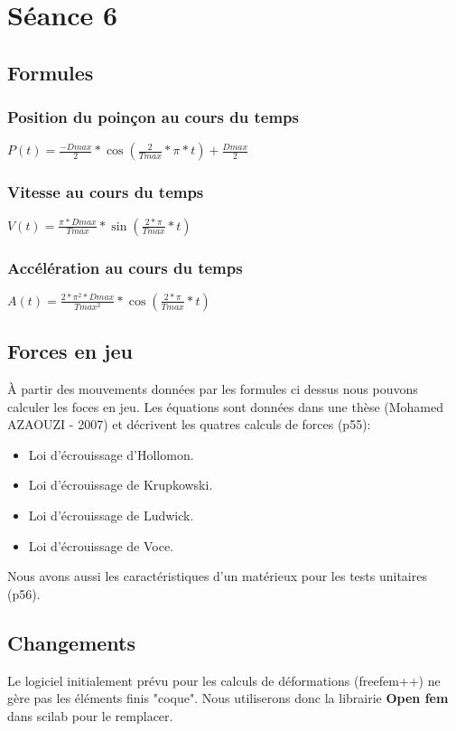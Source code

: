 \section{Séance 6}

\subsection{Formules}
\subsubsection{Position du poinçon au cours du temps}
$P(t) = \frac{-Dmax}{2}*\cos(\frac{2}{Tmax}*\pi*t)+\frac{Dmax}{2}$

\subsubsection{Vitesse au cours du temps}
$V(t) = \frac{\pi*Dmax}{Tmax}*\sin(\frac{2*\pi}{Tmax}*t)$

\subsubsection{Accélération au cours du temps}
$A(t) = \frac{2*\pi^2*Dmax}{Tmax^2}*\cos(\frac{2*\pi}{Tmax}*t)$

\subsection{Forces en jeu}
À partir des mouvements données par les formules ci dessus nous pouvons calculer les foces en jeu.
Les équations sont données dans une thèse (Mohamed AZAOUZI - 2007) et décrivent les quatres calculs de forces (p55):
\begin{itemize}
    \item Loi d'écrouissage d'Hollomon.
    \item Loi d'écrouissage de Krupkowski.
    \item Loi d'écrouissage de Ludwick.
    \item Loi d'écrouissage de Voce.
\end{itemize}
Nous avons aussi les caractéristiques d'un matérieux pour les tests unitaires (p56).

\subsection{Changements}
Le logiciel initialement prévu pour les calculs de déformations (freefem++) ne gère pas les éléments finis "coque".
Nous utiliserons donc la librairie \textbf{Open fem} dans scilab pour le remplacer.
